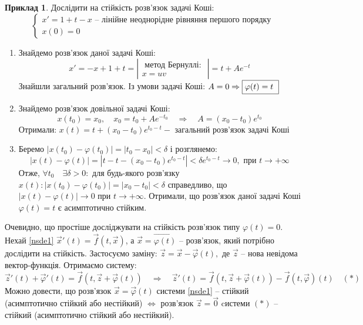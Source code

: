 \documentclass[14pt,a4paper]{scrartcl}
\theoremstyle{definition}
\newtheorem*{example}{Приклад}
\theoremstyle{definition}
\theoremstyle{definition}
\begin{document}
\begin{example}
    Дослідити на стійкість розв'язок  задачі Коші:
    $$
    \begin{cases}
        x' = 1 + t - x \text{  -- лінійне неоднорідне рівняння першого порядку}\\
        x(0) = 0
    \end{cases}
    $$
    \begin{enumerate}

    \item Знайдемо розв'язок даної задачі Коші:
    $$
    x' = - x + 1 + t = \left| \begin{gathered}
     \text{ метод Бернуллі: } \\ x = uv
    \end{gathered}\right| = t + Ae^{-t}
    $$
    Знайшли загальний розв'язок. Із умови задачі Коші: $ A = 0 \Rightarrow \fbox {$\varphi(t) = t$ }$

    \item Знайдемо розв'язок довільної задачі Коші:
    $$
    x(t_0) = x_0, \quad x_0 = t_0 + Ae^{-t_0} \quad \Rightarrow \quad A = (x_0 - t_0) e^{t_0}
    $$
    Отримали: $x(t) = t + (x_0 - t_0) e^{t_0 - t} - \text{ загальний розв'язок задачі Коші}$

    \item Беремо $\left| x(t_0) - \varphi(t_0) \right| = |t_0 - x_0| < \delta$ і розглянемо:
    $$\left| x(t) - \varphi(t) \right| = |t - t - (x_0 - t_0)e^{t_0 - t}| < \delta e^{t_0 - t} \rightarrow 0, \text{ при } t \rightarrow + \infty$$
    Отже, $\forall t_0 \quad \exists \delta > 0 :$ для будь-якого розв'язку $x(t): |x(t_0) - \varphi(t_0)| = |x_0 - t_0| < \delta$ справедливо, що $|x(t) - \varphi(t)| \rightarrow 0 \text{ при } t \rightarrow + \infty$. Отримали, що розв'язок даної задачі Коші $\varphi(t) = t$ є асимптотично стійким.
    \end{enumerate}
\end{example}

\remark
Очевидно, що простіше досліджувати на стійкість розв'язок типу $\varphi(t) = 0$. Нехай \eqref{nsde1} $\overrightarrow{x}'(t) = \overrightarrow{f}(t, \overrightarrow{x})$, а $\overrightarrow{x} = \overrightarrow{\varphi(t)}$ -- розв'язок, який потрібно дослідити на стійкість. Застосуємо заміну: $\overrightarrow{z} = \overrightarrow{x} - \overrightarrow{\varphi}(t), \text{ де } \overrightarrow{z}$ -- нова невідома вектор-функція. Отримаємо систему:
$$
\overrightarrow{z}'(t) + \overrightarrow{\varphi}'(t) = \overrightarrow{f}(t, \overrightarrow{z} + \overrightarrow{\varphi}(t)) \quad \Rightarrow \quad \overrightarrow{z}'(t) = \overrightarrow{f}(t, \overrightarrow{z} + \overrightarrow{\varphi}(t)) - \overrightarrow{f}(t, \overrightarrow{\varphi})(t) \quad (*)
$$
Можно довести, що розв'язок $\overrightarrow{x} = \overrightarrow{\varphi}(t)$ системи \eqref{nsde1} -- стійкий (асимптотично стійкий або нестійкий) $\Longleftrightarrow$ розв'язок $\overrightarrow{z} = \overrightarrow{0}$  cистеми $(*)$ -- стійкий (асимптотично стійкий або нестійкий).
\end{document}
